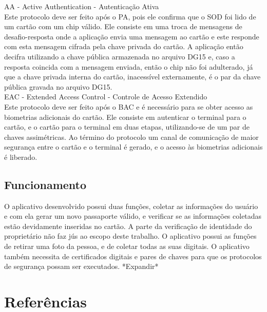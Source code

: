 \documentclass{article}
\begin{document}
\begin{justify}
			\hspace*{2cm} AA - Active Authentication - Autenticação Ativa\\
			\hspace*{2cm} Este protocolo deve ser feito após o PA, pois ele confirma que o SOD foi lido de um cartão com um chip válido. Ele consiste em uma troca de mensagens de desafio-resposta onde a aplicação envia uma mensagem ao cartão e este responde com esta mensagem cifrada pela chave privada do cartão. A aplicação então decifra utilizando a chave pública armazenada no arquivo DG15 e, caso a resposta coincida com a mensagem enviada, então o chip não foi adulterado, já que a chave privada interna do cartão, inacessível externamente, é o par da chave pública gravada no arquivo DG15.\\
			
			\hspace*{2cm} EAC - Extended Access Control - Controle de Acesso Extendido\\
			\hspace*{2cm} Este protocolo deve ser feito após o BAC e é necessário para se obter acesso as biometrias adicionais do cartão. Ele consiste em autenticar o terminal para o cartão, e o cartão para o terminal em duas etapas, utilizando-se de um par de chaves assimétricas. Ao término do protocolo um canal de comunicação de maior segurança entre o cartão e o terminal é gerado, e o acesso às biometrias adicionais é liberado.
			
		\end{justify}

	\subsection{Funcionamento}
		\begin{justify}
			\hspace{2cm} O aplicativo desenvolvido possui duas funções, coletar as informações do usuário e com ela gerar um novo passaporte válido, e verificar se as informações coletadas estão devidamente inseridas no cartão. A parte da verificação de identidade do proprietário não faz jús ao escopo deste trabalho. O aplicativo possui as funções de retirar uma foto da pessoa, e de coletar todas as suas digitais. O aplicativo também necessita de certificados digitais e pares de chaves para que os protocolos de segurança possam ser executados.
			\hspace*{2cm} *Expandir*
			
		\end{justify}

	\section{}
		\begin{justify}
			
			
		\end{justify}

\begingroup
	\section{Referências}
		\renewcommand{\section}[2]{}
		
		\printbibliography		
		
\endgroup
\end{document}
